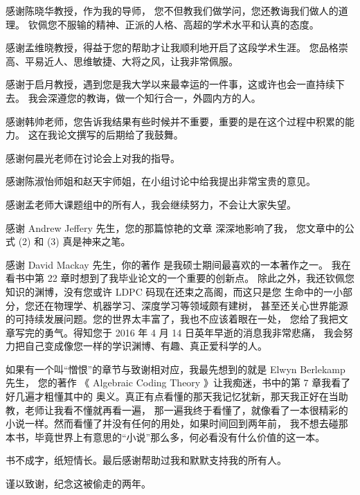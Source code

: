 

感谢陈晓华教授，作为我的导师，
您不但教我们做学问，您还教诲我们做人的道理。
钦佩您不服输的精神、正派的人格、高超的学术水平和认真的态度。

感谢孟维晓教授，得益于您的帮助才让我顺利地开启了这段学术生涯。
您品格崇高、平易近人、思维敏捷、大将之风，让我非常佩服。

感谢于启月教授，遇到您是我大学以来最幸运的一件事，这或许也会一直持续下去。
我会深遵您的教诲，做一个知行合一，外圆内方的人。

感谢韩帅老师，您告诉我结果有些时候并不重要，重要的是在这个过程中积累的能力。
这在我论文撰写的后期给了我鼓舞。

感谢何晨光老师在讨论会上对我的指导。

感谢陈淑怡师姐和赵天宇师姐，在小组讨论中给我提出非常宝贵的意见。

感谢孟老师大课题组中的所有人，我会继续努力，不会让大家失望。


感谢 Andrew Jeffery 先生，您的那篇惊艳的文章 深深地影响了我，
您文章中的公式 (2) 和 (3) 真是神来之笔。

感谢 David Mackay 先生，你的著作  是我硕士期间最喜欢的一本著作之一。
我在看书中第 22 章时想到了我毕业论文的一个重要的创新点。
除此之外，我还钦佩您知识的渊博，没有您或许 LDPC 码现在还束之高阁，而这只是您
生命中的一小部分，您还在物理学、机器学习、深度学习等领域颇有建树，
甚至还关心世界能源的可持续发展问题。您的世界太丰富了，我也不应该着眼在一处，
您给了我把文章写完的勇气。得知您于 2016 年 4 月 14 日英年早逝的消息我非常悲痛，
我会努力把自己变成像您一样的学识渊博、有趣、真正爱科学的人。

如果有一个叫“憎恨”的章节与致谢相对应，我最先想到的就是 Elwyn Berlekamp 先生， 您的著作
《 Algebraic Coding Theory 》让我痴迷，书中的第 7 章我看了好几遍才粗懂其中的
奥义。真正有点看懂的那天我记忆犹新，那天我正好在当助教，老师让我看不懂就再看一遍，
那一遍我终于看懂了，就像看了一本很精彩的小说一样。然而看懂了并没有任何的用处，如果时间回到两年前，
我不想去碰那本书，毕竟世界上有意思的“小说”那么多，何必看没有什么价值的这一本。

书不成字，纸短情长。最后感谢帮助过我和默默支持我的所有人。

谨以致谢，纪念这被偷走的两年。
